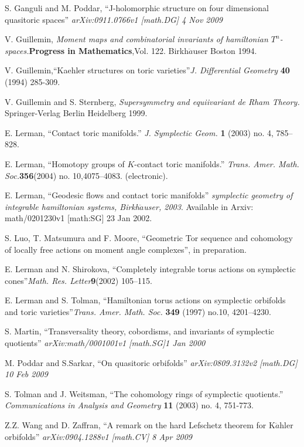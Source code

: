 \documentclass[12pt]{amsart}
\theoremstyle{definition}
\numberwithin{equation}{section}
\begin{document}
\begin{thebibliography}{EHKVI}
S. Ganguli and M. Poddar, ``J-holomorphic structure on four
dimensional quasitoric spaces'' {\em arXiv:0911.0766v1 [math.DG] 4
Nov 2009}

V. Guillemin, {\em Moment maps and combinatorial invariants of
hamiltonian $T^{n}$-spaces.}{\bf Progress in Mathematics},Vol. 122.
Birkh$\ddot{a}$user Boston 1994.

V. Guillemin,``Kaehler structures on toric varieties''{\em J.
Differential Geometry} {\bf 40} (1994) 285-309.

V. Guillemin and S. Sternberg, {\em Supersymmetry and equiivariant
de Rham Theory.} Springer-Verlag Berlin Heidelberg 1999.

E. Lerman,   ``Contact toric manifolds.'' {\em  J. Symplectic Geom.}
{\bf 1} (2003) no. 4, 785--828.

E. Lerman, ``Homotopy groups of $K$-contact toric manifolds.''{\em
Trans. Amer. Math. Soc.}{\bf 356}(2004) no. 10,4075--4083.
(electronic).

E. Lerman, ``Geodesic flows and contact toric manifolds'' {\em
symplectic geometry of integrable hamiltonian systems,
Birkh$\ddot{a}$user, 2003}. Available in Arxiv: math/0201230v1
[math:SG] 23 Jan 2002.

S. Luo, T. Matsumura and F. Moore, ``Geometric Tor sequence and
cohomology of locally free actions on moment angle complexes'', in
preparation.

E. Lerman and N. Shirokova, ``Completely integrable torus actions on
symplectic cones''{\em Math. Res. Letter}{\bf 9}(2002) 105--115.

E. Lerman and S. Tolman, ``Hamiltonian torus actions on symplectic
orbifolds and toric varieties''{\em Trans. Amer. Math. Soc.}{\bf
349} (1997) no.10, 4201--4230.

S. Martin, ``Transversality theory, cobordisms, and invariants of
symplectic quotients'' {\em arXiv:math/0001001v1 [math.SG]1 Jan
2000}

M. Poddar and S.Sarkar, ``On quasitoric orbifolds'' {\em
arXiv:0809.3132v2 [math.DG] 10 Feb 2009}

S. Tolman and J. Weitsman, ``The cohomology rings of symplectic
quotients.'' {\em Communications in Analysis and Geometry} {\bf 11}
(2003) no. 4, 751-773.

Z.Z. Wang and D. Zaffran, ``A remark on the hard Lefschetz theorem
for K$\ddot{a}$hler orbifolds'' {\em arXiv:0904.1288v1 [math.CV] 8
Apr 2009}
\end{thebibliography}
\end{document}
